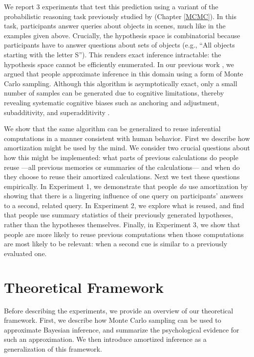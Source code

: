We report 3 experiments that test this prediction using a variant of the probabilistic reasoning task previously studied by \citet{dasgupta17} (Chapter \ref{MCMC}). In this task, participants answer queries about objects in scenes, much like in the examples given above. Crucially, the hypothesis space is combinatorial because participants have to answer questions about sets of objects (e.g., ``All objects starting with the letter S''). This renders exact inference intractable: the hypothesis space cannot be efficiently enumerated. In our previous work \citep{dasgupta17}, we argued that people approximate inference in this domain using a form of Monte Carlo sampling. Although this algorithm is asymptotically exact, only a small number of samples can be generated due to cognitive limitations, thereby revealing systematic cognitive biases such as anchoring and adjustment, subadditivity, and superadditivity \citep{lieder2017empirical,lieder2017anchoring,vul2014one}.

We show that the same algorithm can be generalized to reuse inferential computations in a manner consistent with human behavior. First we describe how amortization might be used by the mind. We consider two crucial questions about how this might be implemented: what parts of previous calculations do people reuse ---all previous memories or summaries of the calculations--- and when do they choose to reuse their amortized calculations. Next we test these questions empirically. In Experiment 1, we demonstrate that people \emph{do} use amortization by showing that there is a lingering influence of one query on participants' answers to a second, related query. In Experiment 2, we explore what is reused, and find that people use summary statistics of their previously generated hypotheses, rather than the hypotheses themselves. Finally, in Experiment 3, we show that people are more likely to reuse previous computations when those computations are most likely to be relevant: when a second cue is similar to a previously evaluated one.

\section{Theoretical Framework}

Before describing the experiments, we provide an overview of our theoretical framework. First, we describe how Monte Carlo sampling can be used to approximate Bayesian inference, and summarize the psychological evidence for such an approximation. We then introduce amortized inference as a generalization of this framework.

